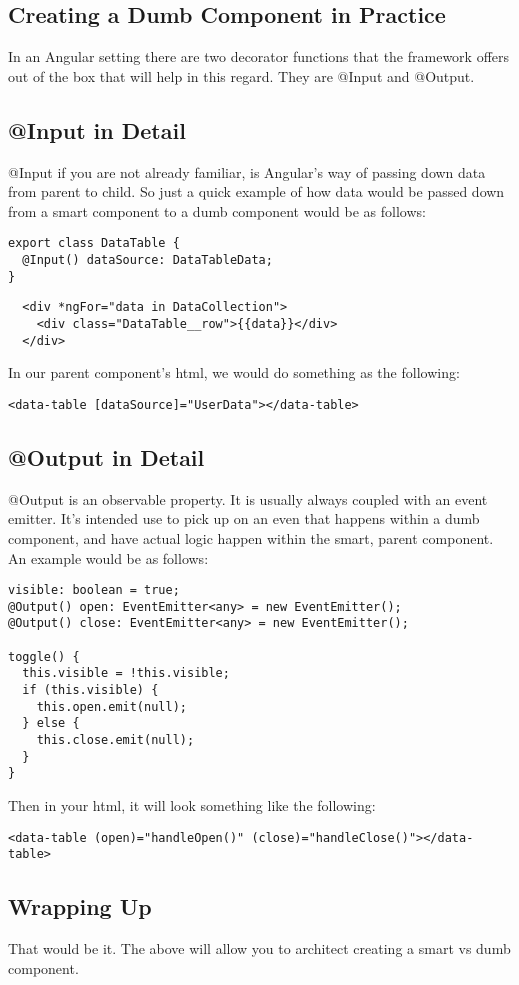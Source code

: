 \subsection{Creating a Dumb Component in Practice}
In an Angular setting there are two decorator functions that the framework
offers out of the box that will help in this regard. They are @Input and
@Output.

\subsection{@Input in Detail}
@Input if you are not already familiar, is Angular's way of passing down data
from parent to child. So just a quick example of how data would be passed down
from a smart component to a dumb component would be as follows:
\begin{lstlisting}
export class DataTable {
  @Input() dataSource: DataTableData;
}
\end{lstlisting}
\begin{verbatim}
  <div *ngFor="data in DataCollection">
    <div class="DataTable__row">{{data}}</div>
  </div>
\end{verbatim}

In our parent component's html, we would do something as the following:
\begin{lstlisting}
<data-table [dataSource]="UserData"></data-table>
\end{lstlisting}


\subsection{@Output in Detail}
@Output is an observable property. It is usually always coupled with an
event emitter. It's intended use to pick up on an even that happens within a
dumb component, and have actual logic happen within the smart, parent component.
An example would be as follows:
\begin{lstlisting}
visible: boolean = true;
@Output() open: EventEmitter<any> = new EventEmitter();
@Output() close: EventEmitter<any> = new EventEmitter();

toggle() {
  this.visible = !this.visible;
  if (this.visible) {
    this.open.emit(null);
  } else {
    this.close.emit(null);
  }
}
\end{lstlisting}
Then in your html, it will look something like the following:
\begin{lstlisting}
<data-table (open)="handleOpen()" (close)="handleClose()"></data-table>
\end{lstlisting}

\subsection{Wrapping Up}
That would be it. The above will allow you to architect creating a smart vs
dumb component.
